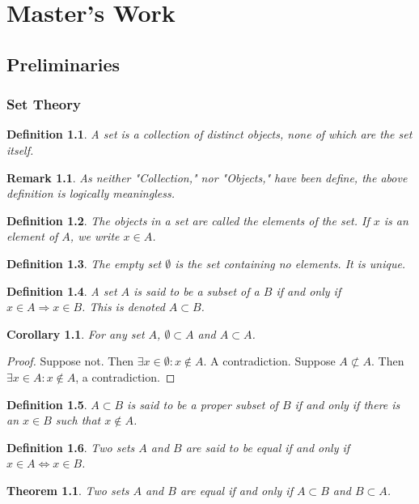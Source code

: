 \documentclass[crop=false,class=book]{standalone}
\theoremstyle{mystyle}
\newtheorem{theorem}{Theorem}[section]
\newtheorem{definition}{Definition}[section]
\newtheorem{corollary}{Corollary}[section]
\newtheorem{remark}{Remark}[section]
\begin{document}
\chapter{Master's Work}
\section{Preliminaries}
\subsection{Set Theory}
\begin{definition}
A set is a collection of distinct objects, none of which are the set itself.
\end{definition}
\begin{remark}
As neither "Collection," nor "Objects," have been define, the above definition is logically meaningless.
\end{remark}
\begin{definition}
The objects in a set are called the elements of the set. If $x$ is an element of $A$, we write $x\in A$.
\end{definition}
\begin{definition}
The empty set $\emptyset$ is the set containing no elements. It is unique.
\end{definition}
\begin{definition}
A set $A$ is said to be a subset of a $B$ if and only if $x\in A\Rightarrow x\in B$. This is denoted $A\subset B$.
\end{definition}
\begin{corollary}
For any set $A$, $\emptyset \subset A$ and $A\subset A$.
\end{corollary}
\begin{proof}
Suppose not. Then $\exists x\in \emptyset: x\notin A$. A contradiction. Suppose $A\not\subset A$. Then $\exists x\in A:x\notin A$, a contradiction.
\end{proof}
\begin{definition}
$A\subset B$ is said to be a proper subset of $B$ if and only if there is an $x\in B$ such that $x\notin A$.
\end{definition}
\begin{definition}
Two sets $A$ and $B$ are said to be equal if and only if $x\in A \Leftrightarrow x\in B$.
\end{definition}
\begin{theorem}
Two sets $A$ and $B$ are equal if and only if $A\subset B$ and $B\subset A$.
\end{theorem}
\end{document}

